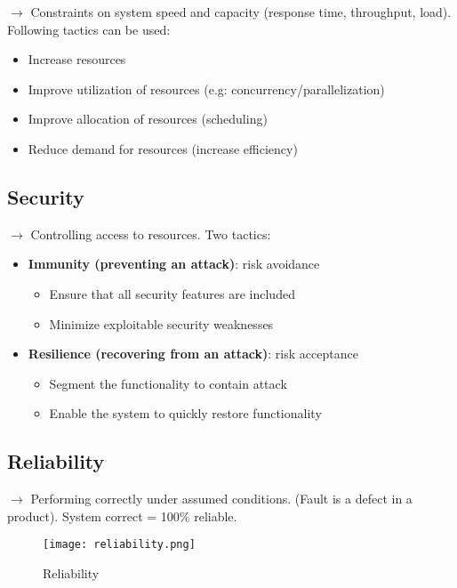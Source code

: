 $\rightarrow$ Constraints on system speed and capacity (response time, throughput, load).
Following tactics can be used:
\begin{itemize}
	\item Increase resources
	\item Improve utilization of resources (e.g:
        concurrency/parallelization)
	\item Improve allocation of resources (scheduling)
	\item Reduce demand for resources (increase efficiency)
\end{itemize}


\subsection{Security}
$\rightarrow$ Controlling access to resources. Two tactics:

\begin{itemize}
    \item \textbf{Immunity (preventing an attack)}: risk avoidance
        \begin{itemize}
            \item Ensure that all security features are included
            \item Minimize exploitable security weaknesses
        \end{itemize}

    \item \textbf{Resilience (recovering from an attack)}: risk
        acceptance
        \begin{itemize}
            \item Segment the functionality to contain attack
            \item Enable the system to quickly restore functionality
        \end{itemize}
\end{itemize}

\subsection{Reliability}

$\rightarrow$ Performing correctly \textcolor{red!80!black}{under assumed conditions}. (Fault is a
defect in a product). System correct = 100\% reliable.

\begin{figure}[!ht]
    \centering
    \texttt{[image: reliability.png]}
    \caption{Reliability}
\end{figure}

